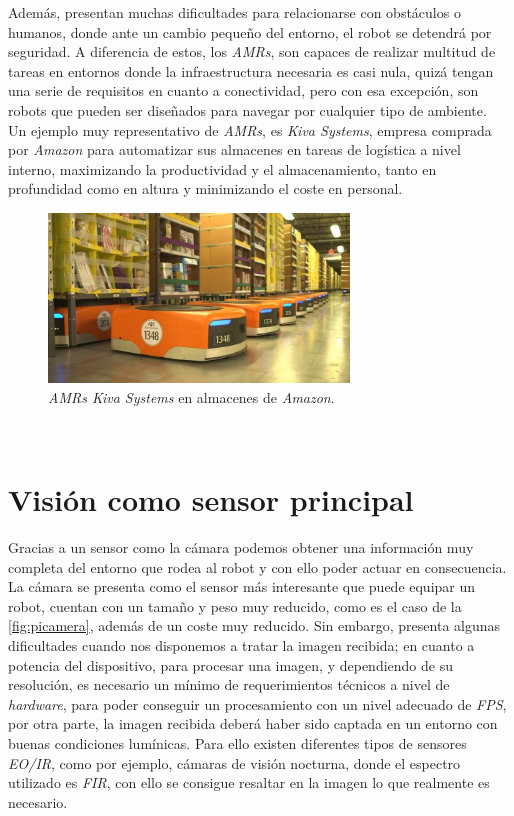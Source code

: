 Además, presentan muchas dificultades para relacionarse con obstáculos o humanos, donde ante un cambio pequeño del entorno, el robot se detendrá por seguridad. A diferencia de estos, los  \textit{AMRs}, son capaces de realizar multitud de tareas en entornos donde la infraestructura necesaria es casi nula, quizá tengan una serie de requisitos en cuanto a conectividad, pero con esa excepción, son robots que pueden ser diseñados para navegar por cualquier tipo de ambiente.\\

Un ejemplo muy representativo de  \textit{AMRs}, es \textit{Kiva Systems}, empresa comprada por \textit{Amazon} para automatizar sus almacenes en tareas de logística a nivel interno, maximizando la productividad y el almacenamiento, tanto en profundidad como en altura y minimizando el coste en personal.\\

\begin{figure} [h!]
	\begin{center}
		\includegraphics[width=8cm]{figs/kivasystems}
	\end{center}
	\caption{\textit{AMRs Kiva Systems} en almacenes de \textit{Amazon}.}
	\label{fig:kivasystems}
\end{figure}\

\section{Visión como sensor principal}
\label{sec:vision}
Gracias a un sensor como la cámara podemos obtener una información muy completa del entorno que rodea al robot y con ello poder actuar en consecuencia. La cámara se presenta como el sensor más interesante que puede equipar un robot, cuentan con un tamaño y peso muy reducido, como es el caso de la \ref{fig:picamera}, además de un coste muy reducido. Sin embargo, presenta algunas dificultades cuando nos disponemos a tratar la imagen recibida; en cuanto a potencia del dispositivo, para procesar una imagen, y dependiendo de su resolución, es necesario un mínimo de requerimientos técnicos a nivel de \textit{hardware}, para poder conseguir un procesamiento con un nivel adecuado de \textit{FPS}, por otra parte, la imagen recibida deberá haber sido captada en un entorno con buenas condiciones lumínicas. Para ello existen diferentes tipos de sensores \textit{EO/IR}, como por ejemplo, cámaras de visión nocturna, donde el espectro utilizado es \textit{FIR}, con ello se consigue resaltar en la imagen lo que realmente es necesario.\\

